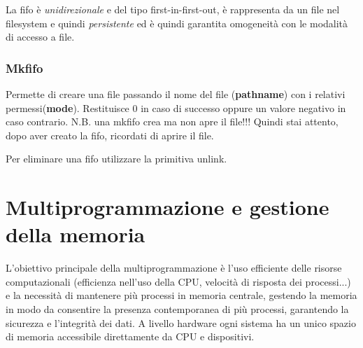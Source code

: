 \documentclass{article}
\begin{document}
\noindent La fifo è \textit{unidirezionale} e del tipo first-in-first-out, è rappresenta da un file 
nel filesystem e quindi \textit{persistente} ed è quindi garantita omogeneità con le modalità di accesso a file.

\subsubsection{Mkfifo}

\noindent {} 
\medskip 

\noindent Permette di creare una file passando il nome del file (\textbf{pathname}) con i relativi permessi(\textbf{mode}).
Restituisce 0 in caso di successo oppure un valore negativo in caso contrario.
N.B. una mkfifo crea ma non apre il file!!! Quindi stai attento, dopo aver creato la fifo, ricordati di aprire il file.

\noindent Per eliminare una fifo utilizzare la primitiva unlink.


\pagebreak

\section{Multiprogrammazione e gestione della memoria}
L'obiettivo principale della multiprogrammazione è l'uso efficiente delle risorse computazionali (efficienza nell'uso della
CPU, velocità di risposta dei processi...) e la necessità di mantenere più processi in memoria centrale, gestendo 
la memoria in modo da consentire la presenza contemporanea di più processi, garantendo la sicurezza e l'integrità dei dati.
A livello hardware ogni sistema ha un unico spazio di memoria accessibile direttamente da CPU e dispositivi.
\end{document}
